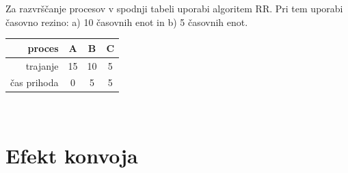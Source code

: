 \begin{Exercise}
Za razvrščanje procesov v spodnji tabeli uporabi algoritem RR. Pri tem uporabi časovno rezino: a) 10 časovnih enot in b) 5 časovnih enot.
\par\vspace{5pt}
{\centering
\begin{tabular}{r|ccc}
	proces & A & B & C \\
	\hline
	trajanje & 15 & 10 & 5  \\
	čas prihoda & 0 & 5 & 5 \\
\end{tabular}\\}
\end{Exercise}


\section{Efekt konvoja}



